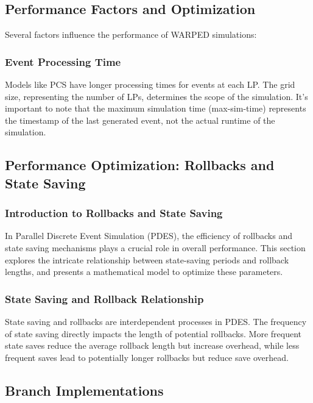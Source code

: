 \subsection{Performance Factors and Optimization}

Several factors influence the performance of WARPED simulations:

\subsubsection{Event Processing Time}

Models like PCS have longer processing times for events at each LP. The grid size, representing the number of LPs, determines the scope of the simulation. It's important to note that the maximum simulation time (max-sim-time) represents the timestamp of the last generated event, not the actual runtime of the simulation.

\subsection{Performance Optimization: Rollbacks and State Saving}

\subsubsection{Introduction to Rollbacks and State Saving}

In Parallel Discrete Event Simulation (PDES), the efficiency of rollbacks and state saving mechanisms plays a crucial role in overall performance. This section explores the intricate relationship between state-saving periods and rollback lengths, and presents a mathematical model to optimize these parameters.

\subsubsection{State Saving and Rollback Relationship}

State saving and rollbacks are interdependent processes in PDES. The frequency of state saving directly impacts the length of potential rollbacks. More frequent state saves reduce the average rollback length but increase overhead, while less frequent saves lead to potentially longer rollbacks but reduce save overhead.

\subsection{Branch Implementations}

